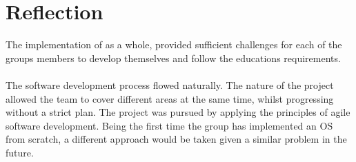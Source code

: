 \section{Reflection}
The implementation of \OSname{} as a whole, provided sufficient challenges
for each of the groups members to develop themselves and follow
the education\textquotesingle s requirements.
\\\\
The software development process flowed naturally.
The nature of the project allowed the team to cover different
areas at the same time, whilst progressing without a strict plan.
The project was pursued by applying the principles of agile software development.
Being the first time the group has implemented an OS from scratch,
a different approach would be taken given a similar problem in the future.
